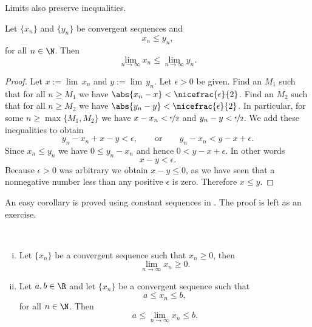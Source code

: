 \documentclass[12pt]{book}
\begin{document}
Limits also preserve inequalities.

\begin{lemma} \label{limandineq:lemma}
Let $\{ x_n \}$ and $\{ y_n \}$ be
convergent sequences and
\begin{equation*}
x_n \leq y_n ,
\end{equation*}
for all $n \in \N$.
Then
\begin{equation*}
\lim_{n\to\infty} x_n \leq
\lim_{n\to\infty} y_n .
\end{equation*}
\end{lemma}

\begin{proof}
Let $x := \lim\, x_n$ and $y := \lim\, y_n$. 
Let 
$\epsilon > 0$ be given.
Find an $M_1$ such that for all $n \geq M_1$
we have $\abs{x_n-x} < \nicefrac{\epsilon}{2}$.
Find an $M_2$ such that
for all $n \geq M_2$ we have
$\abs{y_n-y} < \nicefrac{\epsilon}{2}$.
In particular,
for some $n \geq \max\{ M_1, M_2 \}$ we have
$x-x_n < \nicefrac{\epsilon}{2}$ and
$y_n-y < \nicefrac{\epsilon}{2}$.
We add these inequalities to
obtain
\begin{equation*}
y_n-x_n+x-y < \epsilon, \qquad \text{or} \qquad
y_n-x_n < y-x+ \epsilon .
\end{equation*}
Since $x_n \leq y_n$ we have
$0 \leq y_n-x_n$ and hence $0 < y-x+ \epsilon$.
In other words
\begin{equation*}
x-y < \epsilon .
\end{equation*}
Because $\epsilon > 0$ was arbitrary we obtain
$x-y \leq 0$, as
we have seen that a nonnegative
number less than any positive $\epsilon$ is zero.
Therefore $x \leq y$.
\end{proof}

An easy corollary is
proved
using constant sequences in
.
The proof is left as an exercise.

\begin{cor} \label{limandineq:cor}
{\ }
\begin{enumerate}[(i)]
\item Let $\{ x_n \}$ be a convergent sequence such that $x_n \geq 0$,
then
\begin{equation*}
\lim_{n\to\infty} x_n \geq 0.
\end{equation*}
\item
Let $a,b \in \R$ and
let $\{ x_n \}$ be a convergent sequence such that
\begin{equation*}
a \leq x_n \leq b ,
\end{equation*}
for all $n \in \N$.
Then
\begin{equation*}
a \leq \lim_{n\to\infty} x_n \leq b.
\end{equation*}
\end{enumerate}
\end{cor}
\end{document}
